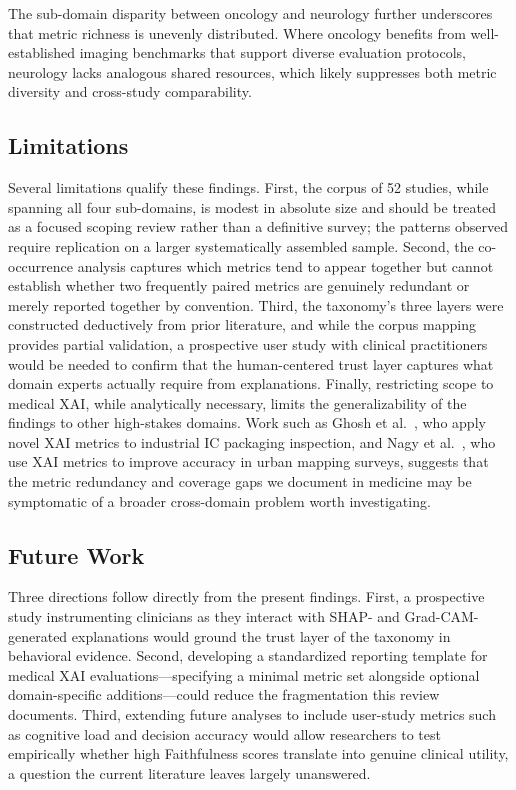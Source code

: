 The sub-domain disparity between oncology and neurology further underscores
that metric richness is unevenly distributed. Where oncology benefits from
well-established imaging benchmarks that support diverse evaluation
protocols, neurology lacks analogous shared resources, which likely
suppresses both metric diversity and cross-study comparability.

\subsection{Limitations}

Several limitations qualify these findings. First, the corpus of 52 studies,
while spanning all four sub-domains, is modest in absolute size and should be
treated as a focused scoping review rather than a definitive survey; the
patterns observed require replication on a larger systematically assembled
sample. Second, the co-occurrence analysis captures which metrics tend to
appear together but cannot establish whether two frequently paired metrics
are genuinely redundant or merely reported together by convention. Third, the taxonomy's three layers
were constructed deductively from prior literature, and while the corpus
mapping provides partial validation, a prospective user study with
clinical practitioners would be needed to confirm that the human-centered
trust layer captures what domain experts actually require from
explanations. Finally, restricting scope to medical XAI, while
analytically necessary, limits the generalizability of the findings
to other high-stakes domains. Work such as Ghosh et
al.~\cite{Ghosh2024DemystifyingEC}, who apply novel XAI metrics to
industrial IC packaging inspection, and Nagy et al.~\cite{Nagy2024ImprovingUM},
who use XAI metrics to improve accuracy in urban mapping surveys, suggests
that the metric redundancy and coverage gaps we document in medicine may
be symptomatic of a broader cross-domain problem worth investigating.

\subsection{Future Work}

Three directions follow directly from the present findings. First,
a prospective study instrumenting clinicians as they interact with
SHAP- and Grad-CAM-generated explanations would ground the trust layer
of the taxonomy in behavioral evidence. Second, developing a standardized
reporting template for medical XAI evaluations---specifying a minimal
metric set alongside optional domain-specific additions---could reduce
the fragmentation this review documents. Third, extending future analyses
to include user-study metrics such as cognitive load and decision accuracy
would allow researchers to test empirically whether high Faithfulness
scores translate into genuine clinical utility, a question the current
literature leaves largely unanswered.
